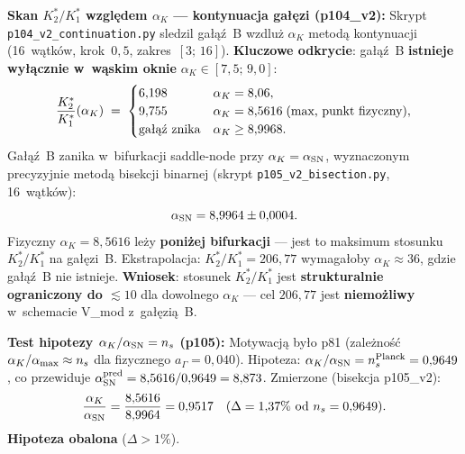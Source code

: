 \begin{remark}
\medskip
\textbf{Skan $K^*_2/K^*_1$ wzgl\k{e}dem $\alpha_K$ --- kontynuacja ga\l{}\k{e}zi (p104\_v2):}
Skrypt \texttt{p104\_v2\_continuation.py} sledzil ga\l{}\k{a}\'z~B
wzdlu\.z $\alpha_K$ metod\k{a} kontynuacji (16~w\k{a}tk\'ow, krok~$0{,}5$,
zakres~$[3;\,16]$).
\textbf{Kluczowe odkrycie}: ga\l{}\k{a}\'z~B \textbf{istnieje wy\l{}\k{a}cznie w~w\k{a}skim
oknie} $\alpha_K \in [7{,}5;\,9{,}0]$:
\begin{equation}\label{eq:K2K1-alpha-scan}
  \frac{K^*_2}{K^*_1}(\alpha_K) \;=\;
  \begin{cases}
    6{,}198 & \alpha_K = 8{,}06, \\
    9{,}755 & \alpha_K = 8{,}5616 \;\text{(max, punkt fizyczny)}, \\
    \text{ga\l{}\k{a}\'z znika} & \alpha_K \geq 8{,}9968.
  \end{cases}
\end{equation}
Ga\l{}\k{a}\'z~B zanika w~bifurkacji saddle-node przy
$\alpha_K = \alpha_{\rm SN}$, wyznaczonym precyzyjnie metod\k{a} bisekcji
binarnej (skrypt \texttt{p105\_v2\_bisection.py}, 16~w\k{a}tk\'ow):
\begin{equation}\label{eq:alphaSN-value}
  \alpha_{\rm SN} = 8{,}9964 \pm 0{,}0004.
\end{equation}
Fizyczny $\alpha_K = 8{,}5616$ le\.zy \textbf{poni\.zej bifurkacji} ---
jest to maksimum stosunku $K^*_2/K^*_1$ na ga\l{}\k{e}zi~B.
Ekstrapolacja: $K^*_2/K^*_1 = 206{,}77$ wymaga\l{}oby $\alpha_K \approx 36$,
gdzie ga\l{}\k{a}\'z~B nie istnieje.
\textbf{Wniosek}: stosunek $K^*_2/K^*_1$ jest \textbf{strukturalnie ograniczony
do $\lesssim 10$} dla dowolnego $\alpha_K$ --- cel $206{,}77$ jest
\textbf{niemo\.zliwy} w~schemacie V\_mod z~ga\l{}\k{e}zi\k{a}~B.

\medskip
\textbf{Test hipotezy $\alpha_K/\alpha_{\rm SN} = n_s$ (p105):}
Motywacj\k{a} by\l{}o p81 (zale\.zno\'s\'c $\alpha_K/\alpha_{\rm max} \approx n_s$
dla fizycznego $a_\Gamma = 0{,}040$).
Hipoteza: $\alpha_K/\alpha_{\rm SN} = n_s^{\rm Planck} = 0{,}9649$,
co przewiduje $\alpha_{\rm SN}^{\rm pred} = 8{,}5616/0{,}9649 = 8{,}873$.
Zmierzone (bisekcja p105\_v2):
\begin{equation}\label{eq:alphaK-alphaSN-ratio}
  \frac{\alpha_K}{\alpha_{\rm SN}} = \frac{8{,}5616}{8{,}9964} = 0{,}9517
  \quad (\Delta = 1{,}37\%\ \text{od}\ n_s = 0{,}9649).
\end{equation}
\textbf{Hipoteza obalona} ($\Delta > 1\%$).


\end{remark}

